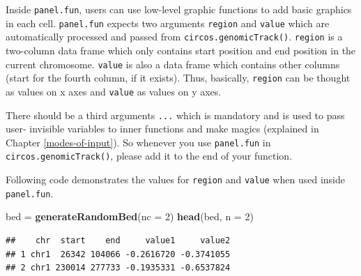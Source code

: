 \documentclass[]{book}
\newenvironment{Shaded}{\begin{snugshade}}{\end{snugshade}}
\newcommand{\KeywordTok}[1]{\textcolor[rgb]{0.13,0.29,0.53}{\textbf{#1}}}
\newcommand{\DataTypeTok}[1]{\textcolor[rgb]{0.13,0.29,0.53}{#1}}
\newcommand{\DecValTok}[1]{\textcolor[rgb]{0.00,0.00,0.81}{#1}}
\newcommand{\StringTok}[1]{\textcolor[rgb]{0.31,0.60,0.02}{#1}}
\newcommand{\OtherTok}[1]{\textcolor[rgb]{0.56,0.35,0.01}{#1}}
\newcommand{\ControlFlowTok}[1]{\textcolor[rgb]{0.13,0.29,0.53}{\textbf{#1}}}
\newcommand{\OperatorTok}[1]{\textcolor[rgb]{0.81,0.36,0.00}{\textbf{#1}}}
\newcommand{\NormalTok}[1]{#1}
\theoremstyle{definition}
\theoremstyle{definition}
\theoremstyle{remark}
\begin{document}
Inside \texttt{panel.fun}, users can use low-level graphic functions to
add basic graphics in each cell. \texttt{panel.fun} expects two
arguments \texttt{region} and \texttt{value} which are automatically
processed and passed from \texttt{circos.genomicTrack()}.
\texttt{region} is a two-column data frame which only contains start
position and end position in the current chromosome. \texttt{value} is
also a data frame which contains other columns (start for the fourth
column, if it exists). Thus, basically, \texttt{region} can be thought
as values on x axes and \texttt{value} as values on y axes.

There should be a third arguments \texttt{...} which is mandatory and is
used to pass user- invisible variables to inner functions and make
magics (explained in Chapter \ref{modes-of-input}). So whenever you use
\texttt{panel.fun} in \texttt{circos.genomicTrack()}, please add it to
the end of your function.

Following code demonstrates the values for \texttt{region} and
\texttt{value} when used inside \texttt{panel.fun}.

\begin{Shaded}
\begin{Highlighting}[]
\NormalTok{bed =}\StringTok{ }\KeywordTok{generateRandomBed}\NormalTok{(}\DataTypeTok{nc =} \DecValTok{2}\NormalTok{)}
\KeywordTok{head}\NormalTok{(bed, }\DataTypeTok{n =} \DecValTok{2}\NormalTok{)}
\end{Highlighting}
\end{Shaded}

\begin{verbatim}
##    chr  start    end     value1     value2
## 1 chr1  26342 104066 -0.2616720 -0.3741055
## 2 chr1 230014 277733 -0.1935331 -0.6537824
\end{verbatim}

\begin{Shaded}
\end{Shaded}
\end{document}
